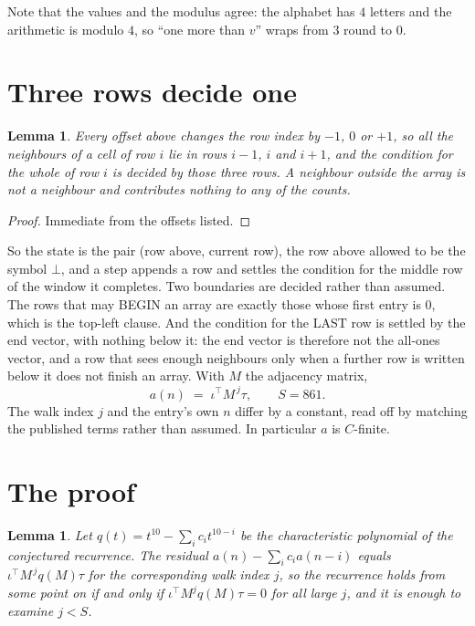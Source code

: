 \documentclass[11pt,a4paper]{article}
\theoremstyle{plain}
\newtheorem{lemma}[theorem]{Lemma}
\theoremstyle{definition}
\begin{document}
Note that the values and the modulus agree: the alphabet has $4$ letters and the arithmetic
is modulo $4$, so ``one more than $v$'' wraps from $3$ round to $0$.

\section{Three rows decide one}

\begin{lemma}\label{lem:win}
Every offset above changes the row index by $-1$, $0$ or $+1$, so all the neighbours of a cell
of row $i$ lie in rows $i-1$, $i$ and $i+1$, and the condition for the whole of row $i$ is
decided by those three rows. A neighbour outside the array is not a neighbour and contributes
nothing to any of the counts.
\end{lemma}

\begin{proof}
Immediate from the offsets listed.
\end{proof}

So the state is the pair (row above, current row), the row above allowed to be the symbol
$\bot$, and a step appends a row and settles the condition for the middle row of the window it
completes. Two boundaries are decided rather than assumed. The rows that may BEGIN an array are
exactly those whose first entry is $0$, which is the top-left clause. And the condition for the
LAST row is settled by the end vector, with nothing below it: the end vector is therefore not
the all-ones vector, and a row that sees enough neighbours only when a further row is written
below it does not finish an array. With $M$ the adjacency matrix,
\[
a(n)\;=\;\iota^{\!\top}M^{\,j}\tau ,\qquad S=861.
\]
The walk index $j$ and the entry's own $n$ differ by a constant, read off by matching the
published terms rather than assumed. In particular $a$ is $C$-finite.

\section{The proof}

\begin{lemma}\label{lem:crit}
Let $q(t)=t^{10}-\sum_i c_it^{10-i}$ be the characteristic polynomial of the
conjectured recurrence. The residual $a(n)-\sum_ic_ia(n-i)$ equals
$\iota^{\!\top}M^{\,j}q(M)\tau$ for the corresponding walk index $j$, so the recurrence
holds from some point on if and only if $\iota^{\!\top}M^{j}q(M)\tau=0$ for all large $j$,
and it is enough to examine $j<S$.
\end{lemma}
\end{document}
